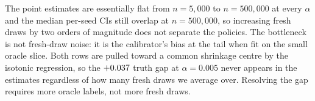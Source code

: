 \documentclass[11pt]{article}
\begin{document}
The point estimates are essentially flat from $n = 5{,}000$ to $n = 500{,}000$ at every $\alpha$ and the median per-seed CIs still overlap at $n = 500{,}000$, so increasing fresh draws by two orders of magnitude does not separate the policies. The bottleneck is not fresh-draw noise: it is the calibrator's bias at the tail when fit on the small oracle slice. Both rows are pulled toward a common shrinkage centre by the isotonic regression, so the $+0.037$ truth gap at $\alpha = 0.005$ never appears in the estimates regardless of how many fresh draws we average over. Resolving the gap requires more oracle labels, not more fresh draws.
\end{document}
